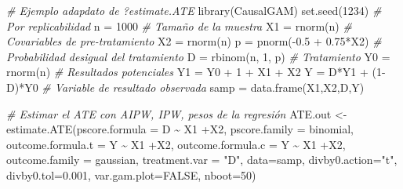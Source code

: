 \documentclass[
]{article}
\newenvironment{Shaded}{\begin{snugshade}}{\end{snugshade}}
\newcommand{\AttributeTok}[1]{\textcolor[rgb]{0.77,0.63,0.00}{#1}}
\newcommand{\CommentTok}[1]{\textcolor[rgb]{0.56,0.35,0.01}{\textit{#1}}}
\newcommand{\ConstantTok}[1]{\textcolor[rgb]{0.00,0.00,0.00}{#1}}
\newcommand{\DecValTok}[1]{\textcolor[rgb]{0.00,0.00,0.81}{#1}}
\newcommand{\FloatTok}[1]{\textcolor[rgb]{0.00,0.00,0.81}{#1}}
\newcommand{\FunctionTok}[1]{\textcolor[rgb]{0.00,0.00,0.00}{#1}}
\newcommand{\NormalTok}[1]{#1}
\newcommand{\OtherTok}[1]{\textcolor[rgb]{0.56,0.35,0.01}{#1}}
\newcommand{\SpecialCharTok}[1]{\textcolor[rgb]{0.00,0.00,0.00}{#1}}
\newcommand{\StringTok}[1]{\textcolor[rgb]{0.31,0.60,0.02}{#1}}
\begin{document}
\begin{Shaded}
\begin{Highlighting}[]
\CommentTok{\# Ejemplo adapdato de ?estimate.ATE }
\FunctionTok{library}\NormalTok{(CausalGAM) }
\FunctionTok{set.seed}\NormalTok{(}\DecValTok{1234}\NormalTok{) }\CommentTok{\# Por replicabilidad}
\NormalTok{n }\OtherTok{=} \DecValTok{1000} \CommentTok{\# Tamaño de la muestra}
\NormalTok{X1 }\OtherTok{=} \FunctionTok{rnorm}\NormalTok{(n) }\CommentTok{\# Covariables de pre{-}tratamiento}
\NormalTok{X2 }\OtherTok{=} \FunctionTok{rnorm}\NormalTok{(n) }
\NormalTok{p }\OtherTok{=} \FunctionTok{pnorm}\NormalTok{(}\SpecialCharTok{{-}}\FloatTok{0.5} \SpecialCharTok{+} \FloatTok{0.75}\SpecialCharTok{*}\NormalTok{X2) }\CommentTok{\# Probabilidad desigual del tratamiento}
\NormalTok{D }\OtherTok{=} \FunctionTok{rbinom}\NormalTok{(n, }\DecValTok{1}\NormalTok{, p) }\CommentTok{\# Tratamiento}
\NormalTok{Y0 }\OtherTok{=} \FunctionTok{rnorm}\NormalTok{(n) }\CommentTok{\# Resultados potenciales }
\NormalTok{Y1 }\OtherTok{=}\NormalTok{ Y0 }\SpecialCharTok{+} \DecValTok{1} \SpecialCharTok{+}\NormalTok{ X1 }\SpecialCharTok{+}\NormalTok{ X2 }
\NormalTok{Y }\OtherTok{=}\NormalTok{ D}\SpecialCharTok{*}\NormalTok{Y1 }\SpecialCharTok{+}\NormalTok{ (}\DecValTok{1}\SpecialCharTok{{-}}\NormalTok{D)}\SpecialCharTok{*}\NormalTok{Y0 }\CommentTok{\# Variable de resultado observada}
\NormalTok{samp }\OtherTok{=} \FunctionTok{data.frame}\NormalTok{(X1,X2,D,Y) }

\CommentTok{\# Estimar el ATE con AIPW, IPW, pesos de la regresión}
\NormalTok{ATE.out }\OtherTok{\textless{}{-}} \FunctionTok{estimate.ATE}\NormalTok{(}\AttributeTok{pscore.formula =}\NormalTok{ D }\SpecialCharTok{\textasciitilde{}}\NormalTok{ X1 }\SpecialCharTok{+}\NormalTok{X2, }
                        \AttributeTok{pscore.family =}\NormalTok{ binomial, }
                        \AttributeTok{outcome.formula.t =}\NormalTok{ Y }\SpecialCharTok{\textasciitilde{}}\NormalTok{ X1 }
                        \SpecialCharTok{+}\NormalTok{X2, }
                        \AttributeTok{outcome.formula.c =}\NormalTok{ Y }\SpecialCharTok{\textasciitilde{}}\NormalTok{ X1 }
                        \SpecialCharTok{+}\NormalTok{X2, }
                        \AttributeTok{outcome.family =}\NormalTok{ gaussian, }
                        \AttributeTok{treatment.var =} \StringTok{"D"}\NormalTok{, }
                        \AttributeTok{data=}\NormalTok{samp, }
                        \AttributeTok{divby0.action=}\StringTok{"t"}\NormalTok{, }
                        \AttributeTok{divby0.tol=}\FloatTok{0.001}\NormalTok{, }
                        \AttributeTok{var.gam.plot=}\ConstantTok{FALSE}\NormalTok{, }\AttributeTok{nboot=}\DecValTok{50}\NormalTok{)}
\end{Highlighting}
\end{Shaded}
\end{document}
